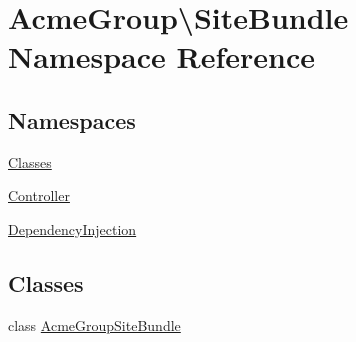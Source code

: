 \hypertarget{namespace_acme_group_1_1_site_bundle}{\section{Acme\+Group\textbackslash{}Site\+Bundle Namespace Reference}
\label{namespace_acme_group_1_1_site_bundle}
}
\subsection*{Namespaces}
\begin{DoxyCompactItemize}
\item 
 \hyperlink{namespace_acme_group_1_1_site_bundle_1_1_classes}{Classes}
\item 
 \hyperlink{namespace_acme_group_1_1_site_bundle_1_1_controller}{Controller}
\item 
 \hyperlink{namespace_acme_group_1_1_site_bundle_1_1_dependency_injection}{Dependency\+Injection}
\end{DoxyCompactItemize}
\subsection*{Classes}
\begin{DoxyCompactItemize}
\item 
class \hyperlink{class_acme_group_1_1_site_bundle_1_1_acme_group_site_bundle}{Acme\+Group\+Site\+Bundle}
\end{DoxyCompactItemize}
